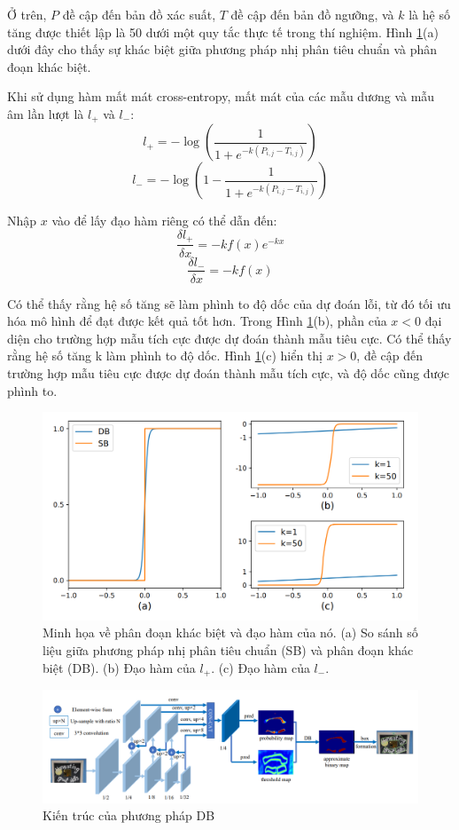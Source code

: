 Ở trên, $P$ đề cập đến bản đồ xác suất, $T$ đề cập đến bản đồ ngưỡng, và $k$ là hệ số tăng được thiết lập là 50 dưới một quy tắc thực tế trong thí nghiệm. Hình \ref{fig11}(a) dưới đây cho thấy sự khác biệt giữa phương pháp nhị phân tiêu chuẩn và phân đoạn khác biệt.

Khi sử dụng hàm mất mát cross-entropy, mất mát của các mẫu dương và mẫu âm lần lượt là $l_+$ và $l_-$:
\[
    l_+ = -\log(\frac{1}{1+e^{-k(P_{i, j}-T_{i, j})}})
\]
\[
    l_- = -\log(1 - \frac{1}{1 + e^{-k(P_{i, j} - T_{i, j})}})
\]

Nhập $x$ vào để lấy đạo hàm riêng có thể dẫn đến:
\[
    \frac{\delta l_+}{\delta x} = -kf(x)e^{-kx}
\]
\[
    \frac{\delta l_-}{\delta x} = -kf(x)   
\]

Có thể thấy rằng hệ số tăng sẽ làm phình to độ dốc của dự đoán lỗi, từ đó tối ưu hóa mô hình để đạt được kết quả tốt hơn. Trong Hình \ref{fig11}(b), phần của $x < 0$ đại diện cho trường hợp mẫu tích cực được dự đoán thành mẫu tiêu cực. Có thể thấy rằng hệ số tăng k làm phình to độ dốc. Hình \ref{fig11}(c) hiển thị $x > 0$, đề cập đến trường hợp mẫu tiêu cực được dự đoán thành mẫu tích cực, và độ dốc cũng được phình to.

\begin{figure}[h]
    \includegraphics[scale=0.5]{images/derivative-DB.png}
    \centering
    \caption{Minh họa về phân đoạn khác biệt và đạo hàm của nó. (a) So sánh số liệu giữa phương pháp nhị phân tiêu chuẩn (SB) và phân đoạn khác biệt (DB). (b) Đạo hàm của $l_+$. (c) Đạo hàm của $l_-$. \cite{liao2019realtime}}
    \label{fig11}
\end{figure}

\begin{figure}[h]
    \includegraphics[scale=0.45]{images/architecture-db.png}
    \centering
    \caption{Kiến trúc của phương pháp DB}
    \label{fig12}
\end{figure}

